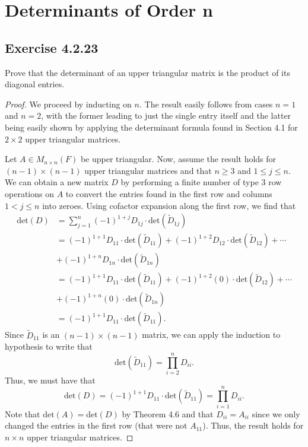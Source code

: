 \section{Determinants of Order n}

\subsection*{Exercise 4.2.23} Prove that the determinant of an upper triangular matrix is the product of its diagonal entries.
\begin{proof}
We proceed by inducting on \( n  \). The result easily follows from cases \( n = 1  \) and \( n = 2  \), with the former leading to just the single entry itself and the latter being easily shown by applying the determinant formula found in Section 4.1 for \( 2 \times 2  \) upper triangular matrices.

Let \( A \in {M}_{n \times n}(F) \) be upper triangular. Now, assume the result holds for \( (n-1) \times (n-1)  \) upper triangular matrices and that \( n \geq 3  \) and \(  1 \leq j \leq n  \). We can obtain a new matrix \( D  \) by performing a finite number of type 3 row operations on \( A  \) to convert the entries found in the first row and columns \( 1 < j \leq n    \) into zeroes. Using cofactor expansion along the first row, we find that  
\begin{align*}
    \text{det}(D) &= \sum_{ j=1 }^{ n } (-1)^{1+j} {D}_{1j} \cdot \text{det}({\tilde{D}}_{1j}) \\
                  &=  (-1)^{1+1} {D}_{11} \cdot \text{det}({\tilde{D}}_{11}) + (-1)^{1+2}{D}_{12} \cdot \text{det}({\tilde{D}}_{12}) + \cdots \\ 
                  &+ (-1)^{1+n} {D}_{1n} \cdot \text{det}({\tilde{D}}_{1n}) \\ 
                  &= (-1)^{1+1} {D}_{11} \cdot \text{det}({\tilde{D}}_{11}) + (-1)^{1+2} (0) \cdot \text{det}({\tilde{D}}_{12}) + \cdots \\ 
                  &+ (-1)^{1+n }(0) \cdot \text{det}({\tilde{D}}_{1n}) \\ 
                  &= (-1)^{1+1} {D}_{11} \cdot \text{det}({\tilde{D}}_{11}).
\end{align*}
Since \( {\tilde{D}}_{11} \) is an \( (n-1) \times (n-1) \) matrix, we can apply the induction to hypothesis to write that
\[  \text{det}({\tilde{D}}_{11}) = \prod_{i=2}^{n} {D}_{ii}.  \]
Thus, we must have that
\[  \text{det}(D) = (-1)^{1+1} {D}_{11} \cdot \text{det}({\tilde{D}}_{11}) = \prod_{i=1}^{n} {D}_{ii}.    \]
Note that \( \text{det}(A) = \text{det}(D) \) by Theorem 4.6 and that \( {D}_{ii} = {A}_{ii} \) since we only changed the entries in the first row (that were not \( {A}_{11} \)). Thus, the result holds for \( n \times n  \) upper triangular matrices. 
\end{proof}

